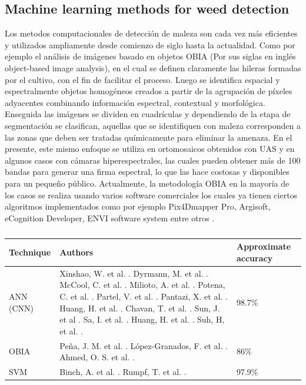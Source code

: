\documentclass[journal,article,submit,moreauthors,pdftex]{Definitions/mdpi}
\begin{document}
\subsection{Machine learning methods for weed detection}


Los metodos computacionales de detección de maleza son cada vez más eficientes y utilizados ampliamente desde comienzo de siglo hasta la actualidad. Como por ejemplo el análisis de imágenes basado en objetos OBIA (Por sus siglas en inglés object-based image analysis), en el cual se definen claramente las hileras formadas por el cultivo, con el fin de facilitar el proceso. Luego se identifica espacial y espectralmente objetos homogéneos creados a partir de la agrupación de píxeles adyacentes combinando información espectral, contextual y morfológica. Enseguida las imágenes se dividen en cuadrículas y dependiendo de la etapa de segmentación se clasifican, aquellas que se identifiquen con maleza corresponden a las zonas que deben ser tratadas químicamente para eliminar la amenaza. En el presente, este mismo enfoque se utiliza en ortomosaicos obtenidos con UAS y en algunos casos con cámaras hiperespectrales, las cuales pueden obtener más de 100 bandas para generar una firma espectral, lo que las hace costosas y disponibles para un pequeño público. Actualmente, la metodología OBIA  en la mayoría de los casos se realiza usando varios software comerciales los cuales ya tienen ciertos algoritmos implementados como por ejemplo Pix4Dmapper Pro, Argisoft, eCognition Developer, ENVI software system entre otros \cite{c19,c27,c28,c29,c43}.

\begin{table}[h]
\caption{}
\begin{tabular}{ | m{5em} | m{10.5cm}| m{1.8cm} | } 
\hline
Technique & Authors  & Approximate accuracy \\
\hline
ANN (CNN) & Xinshao, W. et al. \cite{c11}\cite{c13}. Dyrmann, M. et al. \cite{c12}\cite{c15}\cite{c18}\cite{c37}. McCool, C. et al. \cite{c14}.  Milioto, A. et al. \cite{c16}\cite{c23}. Potena, C. et al. \cite{c17}. Partel, V. et al. \cite{c25}. Pantazi, X. et al. \cite{c26}. Huang, H. et al. \cite{c30}. Chavan, T. et al. \cite{c32}. Sun, J. et al \cite{c33}. Sa, I. et al. \cite{c34}\cite{c39}. Huang, H. et al. \cite{c35}\cite{c38}. Suh, H, et al. \cite{c36}. & 98.7\%       \\ \hline
OBIA & Peña, J. M. et al. \cite{c19}. López-Granados, F. et al. \cite{c27}\cite{c28}. Ahmed, O. S. et al. \cite{c29}.   &86\% \\ \hline
SVM   & Binch, A. et al. \cite{c10}. Rumpf, T. et al. \cite{c21}. &97.9\%    \\ \hline
\end{tabular}
\end{table}
\end{document}

